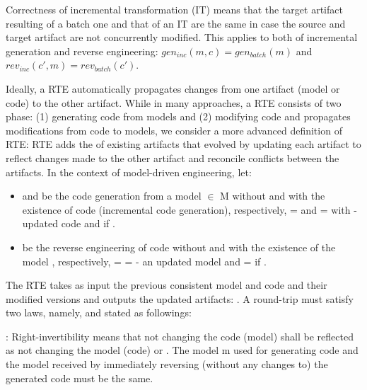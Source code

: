 \begin{definition}
Correctness of incremental transformation (IT) means that the target artifact resulting of a batch one and that of an IT are the same in case the source and target artifact are not concurrently modified. This applies to both of incremental generation and reverse engineering: $gen_{inc} (m, c) = gen_{batch} (m)$ and $rev_{inc} (c', m) = rev_{batch} (c')$.
\end{definition}

Ideally, a RTE automatically propagates changes from one artifact (model or code) to the other artifact. While in many approaches, a RTE consists of two phase: (1) generating code from models and (2) modifying code and propagates modifications from code to models, we consider a more advanced definition of RTE: RTE adds the  of existing artifacts that evolved  by  updating each artifact to reflect changes made to the other artifact and reconcile conflicts between the artifacts. In the context of model-driven engineering, let:

\begin{itemize}
\item {} and  be the code generation from a model  $\in$ M without and with the existence of code  (incremental code generation), respectively,  =  and  =  with  - updated code and  if . 

\item {}  be the reverse engineering of code  without and with the existence of the model , respectively,  =   =  - an updated model and  =  if .
\end{itemize}

The RTE takes as input the previous consistent model and code and their modified versions and outputs the updated artifacts: . A round-trip must satisfy two laws, namely,  and  stated as followings:

\noindent
{}: Right-invertibility means that not changing the code (model) shall be reflected as not changing the model (code) or . The model m used for generating code and the model received by immediately reversing (without any changes to) the generated code must be the same.

